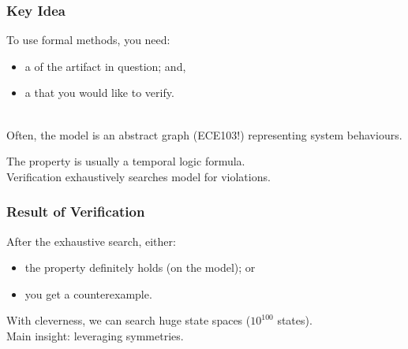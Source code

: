 \begin{frame}
\frametitle{Key Idea}
\begin{changemargin}{1cm}

To use formal methods, you need:
\begin{itemize}
\item a  of the artifact in question; and,
\item a  that you would like to verify.
\end{itemize}~\\

Often, the model is an abstract graph (ECE103!) representing
system behaviours.

The property is usually a temporal logic formula.\\[1em]

Verification exhaustively searches model for
violations.

\end{changemargin}
\end{frame}

\begin{frame}
\frametitle{Result of Verification}
\begin{changemargin}{1cm}

After the exhaustive search, either:
\begin{itemize}
\item the property definitely holds (on the model); or
\item you get a counterexample.
\end{itemize}

With cleverness, we can search huge state spaces ($10^{100}$ states).\\[1em]

Main insight: leveraging symmetries.
\end{changemargin}
\end{frame}

